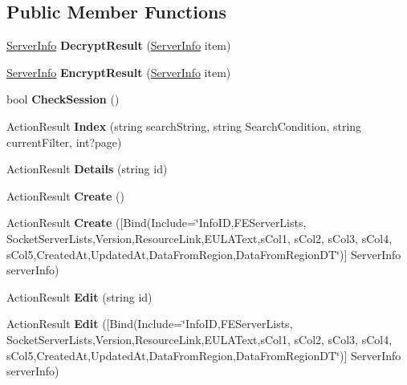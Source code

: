 \subsection*{Public Member Functions}
\begin{DoxyCompactItemize}
\item 
\hyperlink{a00178}{Server\+Info} {\bfseries Decrypt\+Result} (\hyperlink{a00178}{Server\+Info} item)\hypertarget{a00179_af02975f969a32d43b30609f50e2fa766}{}\label{a00179_af02975f969a32d43b30609f50e2fa766}

\item 
\hyperlink{a00178}{Server\+Info} {\bfseries Encrypt\+Result} (\hyperlink{a00178}{Server\+Info} item)\hypertarget{a00179_ab53579e7ec6135afbc53b2971f76db62}{}\label{a00179_ab53579e7ec6135afbc53b2971f76db62}

\item 
bool {\bfseries Check\+Session} ()\hypertarget{a00179_a693973cf865be8b04add8b26f231e4ea}{}\label{a00179_a693973cf865be8b04add8b26f231e4ea}

\item 
Action\+Result {\bfseries Index} (string search\+String, string Search\+Condition, string current\+Filter, int?page)\hypertarget{a00179_ad61e3c876659fec97330fdfd0021f9cc}{}\label{a00179_ad61e3c876659fec97330fdfd0021f9cc}

\item 
Action\+Result {\bfseries Details} (string id)\hypertarget{a00179_aad09cb4d3482c9083610d6dfae088493}{}\label{a00179_aad09cb4d3482c9083610d6dfae088493}

\item 
Action\+Result {\bfseries Create} ()\hypertarget{a00179_afd86eb746534364881bbb3fb295ae3c0}{}\label{a00179_afd86eb746534364881bbb3fb295ae3c0}

\item 
Action\+Result {\bfseries Create} (\mbox{[}Bind(Include=\char`\"{}Info\+ID,F\+E\+Server\+Lists, Socket\+Server\+Lists,Version,Resource\+Link,E\+U\+L\+A\+Text,s\+Col1, s\+Col2, s\+Col3, s\+Col4, s\+Col5,Created\+At,Updated\+At,Data\+From\+Region,Data\+From\+Region\+DT\char`\"{})\mbox{]} Server\+Info server\+Info)\hypertarget{a00179_af5b78d093d9e392457328ffb969d8c69}{}\label{a00179_af5b78d093d9e392457328ffb969d8c69}

\item 
Action\+Result {\bfseries Edit} (string id)\hypertarget{a00179_a795e1309028b91eb247be00c83944efa}{}\label{a00179_a795e1309028b91eb247be00c83944efa}

\item 
Action\+Result {\bfseries Edit} (\mbox{[}Bind(Include=\char`\"{}Info\+ID,F\+E\+Server\+Lists, Socket\+Server\+Lists,Version,Resource\+Link,E\+U\+L\+A\+Text,s\+Col1, s\+Col2, s\+Col3, s\+Col4, s\+Col5,Created\+At,Updated\+At,Data\+From\+Region,Data\+From\+Region\+DT\char`\"{})\mbox{]} Server\+Info server\+Info)\hypertarget{a00179_accf134cd6c54f75a45adeb5b02300789}{}\label{a00179_accf134cd6c54f75a45adeb5b02300789}


\end{DoxyCompactItemize}
